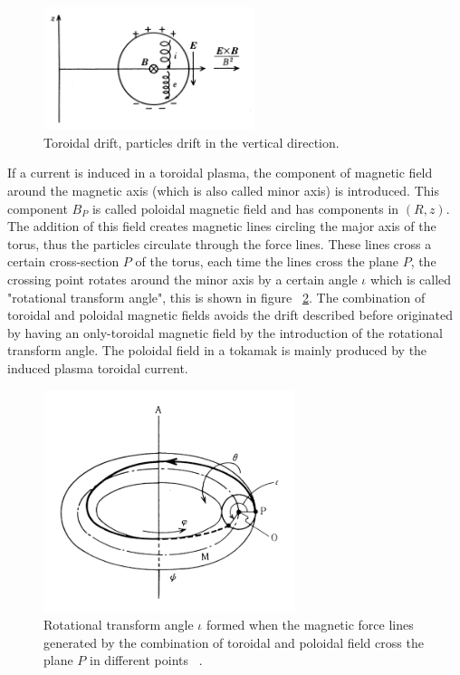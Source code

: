 \begin{figure}
	\centering
	\includegraphics[width=0.55\textwidth]{Chp1/ToroidalDrift.png}
	\caption{Toroidal drift, particles drift in the vertical direction. ~\cite[Chapter~3]{Miyamoto2011} \label{TDrift}}
\end{figure}



If a current is induced in a toroidal plasma, the component of magnetic field around the magnetic axis (which is also called minor axis) is introduced. This component $B_P$ is called poloidal magnetic field and has components in $(R,z)$. The addition of this field creates magnetic lines circling the major axis of the torus, thus the particles circulate through the force lines. These lines cross a certain cross-section $P$ of the torus, each time the lines cross the plane $P$, the crossing point rotates around the minor axis by a certain angle $\iota$ which is called "rotational transform angle", this is shown in figure ~\ref{rot_angle}. The combination of toroidal and poloidal magnetic fields avoids the drift  described before originated by having an only-toroidal magnetic field by the introduction of the  rotational transform angle. The poloidal field in a tokamak is mainly produced by the induced plasma toroidal current.  \smallskip

\begin{figure}
	\centering
	\includegraphics[width=0.655\textwidth]{Chp1/rotational_angle.png}
	\caption{Rotational transform angle $\iota$ formed when the magnetic force lines generated by the combination of toroidal and poloidal field cross the plane $P$ in different points  ~\cite[Chapter~3]{Miyamoto2011}. \label{rot_angle}}
\end{figure}

